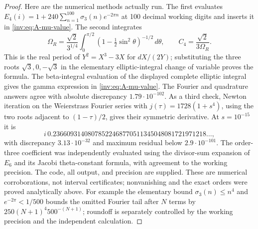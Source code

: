\begin{proof}
Here are the numerical methods actually run.  The first evaluates
$E_4(i)=1+240\sum_{n=1}^{100}\sigma_3(n)e^{-2\pi n}$ at 100
decimal working digits and inserts it in \eqref{inv:eq:A-mu-value}.
The second integrates
\[
\Omega_R=\frac{\sqrt2}{3^{1/4}}
\int_0^{\pi/2}(1-\tfrac12\sin^2\theta)^{-1/2}\,d\theta,
\qquad C_4=\frac{\sqrt2}{3\Omega_R}.
\]
This is the real period of $Y^2=X^3-3X$ for $dX/(2Y)$; substituting
the three roots $\sqrt3,0,-\sqrt3$ in the elementary elliptic-integral
change of variable proves the formula.  The beta-integral evaluation
of the displayed complete elliptic integral gives the gamma
expression in \eqref{inv:eq:A-mu-value}.  The Fourier and quadrature
answers agree with absolute discrepancy $1.79\cdot10^{-102}$.
As a third check, Newton iteration on the Weierstrass Fourier series
with $j(\tau)=1728(1+s^4)$, using the two roots adjacent to
$(1-\tau)/2$, gives their symmetric derivative.  At $s=10^{-15}$ it
is
\[
i\,0.23660931408078522468770511345048081721971218\ldots,
\]
with discrepancy $3.13\cdot10^{-32}$ and maximum residual below
$2.9\cdot10^{-101}$.  The order-three coefficient was independently
evaluated using the divisor-sum expansion of $E_6$ and its Jacobi
theta-constant formula, with agreement to the working precision.
The code, all output, and precision are supplied.  These are numerical
corroborations, not interval certificates; nonvanishing and the exact
orders were proved analytically above.  For example the elementary
bound $\sigma_3(n)\le n^4$ and $e^{-2\pi}<1/500$ bounds the omitted
Fourier tail after $N$ terms by
$250(N+1)^4 500^{-(N+1)}$; roundoff is separately controlled by
the working precision and the independent calculation.
\end{proof}

